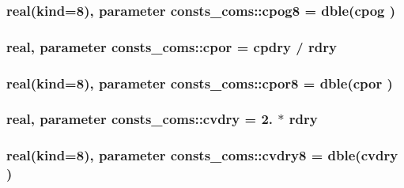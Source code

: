 \subsubsection[{\texorpdfstring{cpog8}{cpog8}}]{\setlength{\rightskip}{0pt plus 5cm}real(kind=8), parameter consts\+\_\+coms\+::cpog8 = dble({\bf cpog} )}\hypertarget{namespaceconsts__coms_a9f05c57252e5f7783d8934d0888ac43e}{}\label{namespaceconsts__coms_a9f05c57252e5f7783d8934d0888ac43e}
\subsubsection[{\texorpdfstring{cpor}{cpor}}]{\setlength{\rightskip}{0pt plus 5cm}real, parameter consts\+\_\+coms\+::cpor = {\bf cpdry} / {\bf rdry}}\hypertarget{namespaceconsts__coms_aa70dadabd4c23c98f57b0d05afaf13b9}{}\label{namespaceconsts__coms_aa70dadabd4c23c98f57b0d05afaf13b9}
\subsubsection[{\texorpdfstring{cpor8}{cpor8}}]{\setlength{\rightskip}{0pt plus 5cm}real(kind=8), parameter consts\+\_\+coms\+::cpor8 = dble({\bf cpor} )}\hypertarget{namespaceconsts__coms_adb9142a68880010b3ef32a291ad3e3d7}{}\label{namespaceconsts__coms_adb9142a68880010b3ef32a291ad3e3d7}
\subsubsection[{\texorpdfstring{cvdry}{cvdry}}]{\setlength{\rightskip}{0pt plus 5cm}real, parameter consts\+\_\+coms\+::cvdry = 2. $\ast$ {\bf rdry}}\hypertarget{namespaceconsts__coms_a7ed4bae72e857ae9a2dcad4061279ad0}{}\label{namespaceconsts__coms_a7ed4bae72e857ae9a2dcad4061279ad0}
\subsubsection[{\texorpdfstring{cvdry8}{cvdry8}}]{\setlength{\rightskip}{0pt plus 5cm}real(kind=8), parameter consts\+\_\+coms\+::cvdry8 = dble({\bf cvdry} )}\hypertarget{namespaceconsts__coms_a8c9aee21be43c057704b21f857d05968}{}\label{namespaceconsts__coms_a8c9aee21be43c057704b21f857d05968}
